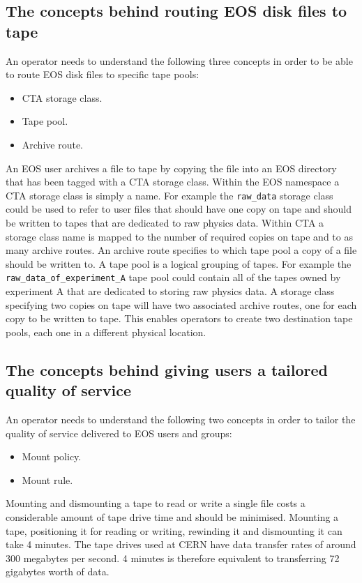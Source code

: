 \documentclass[a4paper]{jpconf}
\begin{document}
\subsection{The concepts behind routing EOS disk files to tape}
An operator needs to understand the following three concepts in order to be able
to route EOS disk files to specific tape pools:
\begin{itemize}
  \item CTA storage class.
  \item Tape pool.
  \item Archive route.
\end{itemize}
An EOS user archives a file to tape by copying the file into an EOS directory
that has been tagged with a CTA storage class.  Within the EOS namespace a CTA
storage class is simply a name.  For example the \texttt{raw\_data} storage
class could be used to refer to user files that should have one copy on tape and
should be written to tapes that are dedicated to raw physics data.  Within CTA a
storage class name is mapped to the number of required copies on tape and to as
many archive routes.  An archive route specifies to which tape pool a copy of
a file should be written to. A tape pool is a logical grouping of tapes.  For
example the \texttt{raw\_data\_of\_experiment\_A} tape pool could contain all of
the tapes owned by experiment A that are dedicated to storing raw physics data.
A storage class specifying two copies on tape will have two associated archive
routes, one for each copy to be written to tape.  This enables operators to
create two destination tape pools, each one in a different physical location.

\subsection{The concepts behind giving users a tailored quality of service} 
An operator needs to understand the following two concepts in order to tailor
the quality of service delivered to EOS users and groups:
\begin{itemize}
  \item Mount policy.
  \item Mount rule.
\end{itemize}
Mounting and dismounting a tape to read or write a single file costs a
considerable amount of tape drive time and should be minimised.  Mounting a
tape, positioning it for reading or writing, rewinding it and dismounting it can
take 4 minutes.  The tape drives used at CERN have data transfer rates of around
300 megabytes per second.  4 minutes is therefore equivalent to transferring 72
gigabytes worth of data.
\end{document}
